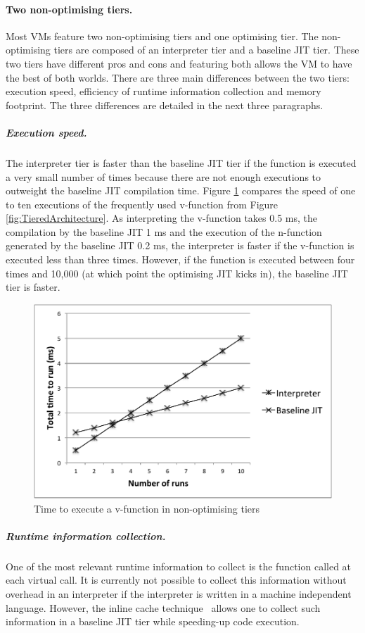 \documentclass[a4paper,12pt,twoside]{../includes/ThesisStyle}
\begin{document}
\paragraph{Two non-optimising tiers.}Most VMs feature two non-optimising tiers and one optimising tier. The non-optimising tiers are composed of an interpreter tier and a baseline JIT tier. These two tiers have different pros and cons and featuring both allows the VM to have the best of both worlds. There are three main differences between the two tiers: execution speed, efficiency of runtime information collection and memory footprint. The three differences are detailed in the next three paragraphs.

\subparagraph{Execution speed.} The interpreter tier is faster than the baseline JIT tier if the function is executed a very small number of times because there are not enough executions to outweight the baseline JIT compilation time. Figure \ref{fig:NonOptTierGraph} compares the speed of one to ten executions of the frequently used v-function from Figure \ref{fig:TieredArchitecture}. As interpreting the v-function takes 0.5 ms, the compilation by the baseline JIT 1 ms and the execution of the n-function generated by the baseline JIT 0.2 ms, the interpreter is faster if the v-function is executed less than three times. However, if the function is executed between four times and 10,000 (at which point the optimising JIT kicks in), the baseline JIT tier is faster.

\begin{figure}[h!]
    \begin{center}
        \includegraphics[width=0.70\linewidth]{NonOptTierGraph}
        \caption{Time to execute a v-function in non-optimising tiers}
        \label{fig:NonOptTierGraph}
    \end{center}
\end{figure}
	
	\subparagraph{Runtime information collection.} One of the most relevant runtime information to collect is the function called at each virtual call. It is currently not possible to collect this information without overhead in an interpreter if the interpreter is written in a machine independent language. However, the inline cache technique~\cite{Deut84a,Holz91a} allows one to collect such information in a baseline JIT tier while speeding-up code execution.
	
\end{document}
